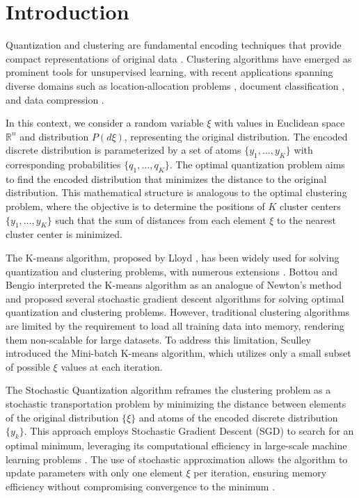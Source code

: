 \section{Introduction}

Quantization and clustering are fundamental encoding techniques that provide compact representations of original data \cite{Graf_Luschgy_2000,Scholkopf_Smola_2002,Jain_2010}. Clustering algorithms have emerged as prominent tools for unsupervised learning, with recent applications spanning diverse domains such as location-allocation problems \cite{Wang_Wei_2020}, document classification \cite{Widodo_2011,Radomirovic_2023}, and data compression \cite{Wan_2019}.

In this context, we consider a random variable $\xi$ with values in Euclidean space $\mathbb{R}^n$ and distribution $P(d\xi)$, representing the original distribution. The encoded discrete distribution is parameterized by a set of atoms $\{y_1, \ldots, y_K\}$ with corresponding probabilities $\{q_1, \ldots, q_K\}$. The optimal quantization problem aims to find the encoded distribution that minimizes the distance to the original distribution. This mathematical structure is analogous to the optimal clustering problem, where the objective is to determine the positions of $K$ cluster centers $\{y_1, \ldots, y_K\}$ such that the sum of distances from each element $\xi$ to the nearest cluster center is minimized.

The K-means algorithm, proposed by Lloyd \cite{Lloyd_1982}, has been widely used for solving quantization and clustering problems, with numerous extensions \cite{Jain_2010}. Bottou and Bengio \cite{Bottou_1994} interpreted the K-means algorithm as an analogue of Newton's method and proposed several stochastic gradient descent algorithms for solving optimal quantization and clustering problems. However, traditional clustering algorithms are limited by the requirement to load all training data into memory, rendering them non-scalable for large datasets. To address this limitation, Sculley \cite{Sculley_2010} introduced the Mini-batch K-means algorithm, which utilizes only a small subset of possible $\xi$ values at each iteration.

The Stochastic Quantization algorithm reframes the clustering problem as a stochastic transportation problem \cite{Lakshmanan_Pichler_2023,Kuzmenko_Uryasev_2019} by minimizing the distance between elements of the original distribution $\{\xi\}$ and atoms of the encoded discrete distribution $\{y_k\}$. This approach employs Stochastic Gradient Descent (SGD) \cite{ermoliev1976stochastic,kiefer1952stochastic,Robbins_Monro_1951} to search for an optimal minimum, leveraging its computational efficiency in large-scale machine learning problems \cite{Bottou_2010}. The use of stochastic approximation allows the algorithm to update parameters with only one element $\xi$ per iteration, ensuring memory efficiency without compromising convergence to the minimum \cite{Newton_Yousefian_Pasupathy_2018}.

